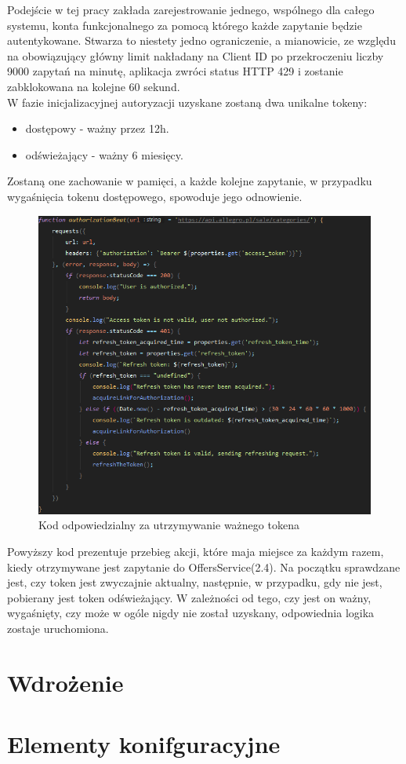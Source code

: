 Podejście w tej pracy zakłada zarejestrowanie jednego, wspólnego dla całego systemu, konta funkcjonalnego za pomocą którego każde zapytanie będzie autentykowane. Stwarza to niestety jedno ograniczenie, a mianowicie, ze względu na obowiązujący główny limit nakładany na Client ID po przekroczeniu liczby 9000 zapytań na minutę, aplikacja zwróci status HTTP 429 i zostanie zabklokowana na kolejne 60 sekund.\\
W fazie inicjalizacyjnej autoryzacji uzyskane zostaną dwa unikalne tokeny: 
\begin{itemize}
	\item dostępowy - ważny przez 12h.
	\item odświeżający - ważny 6 miesięcy.
\end{itemize}
Zostaną one zachowanie w pamięci, a każde kolejne zapytanie, w przypadku wygaśnięcia tokenu dostępowego, spowoduje jego odnowienie.
\begin{figure}[H]
	\centering
	\includegraphics[width=\linewidth]{authorization.png}
	\caption{Kod odpowiedzialny za utrzymywanie ważnego tokena}
\end{figure}
Powyższy kod prezentuje przebieg akcji, które maja miejsce za każdym razem, kiedy otrzymywane jest zapytanie do OffersService(2.4). Na początku sprawdzane jest, czy token jest zwyczajnie aktualny, następnie, w przypadku, gdy nie jest, pobierany jest token odświeżający. W zależności od tego, czy jest on ważny, wygaśnięty, czy może w ogóle nigdy nie został uzyskany, odpowiednia logika zostaje uruchomiona.



\section{Wdrożenie}


\section{Elementy konifguracyjne}

